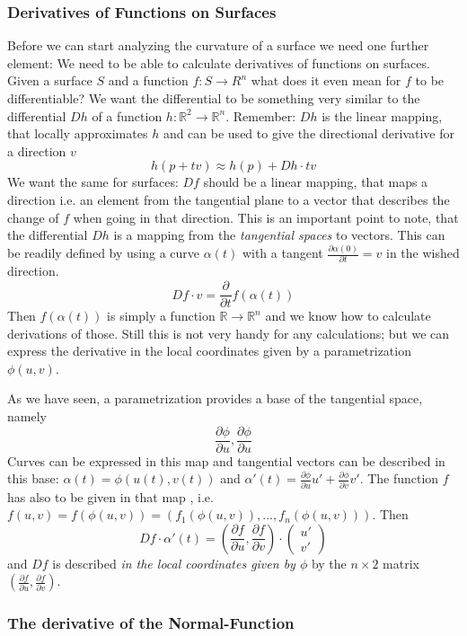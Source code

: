 \subsubsection{Derivatives of Functions on Surfaces}
Before we can start analyzing the curvature of a surface we need one further element: We need to be able to calculate derivatives of functions on surfaces. Given a surface $S$ and a function $f: S \rightarrow R^n$ what does it even mean for $f$ to be differentiable? We want the differential to be something very similar to the differential $Dh$ of a function $h: \mathbb R^2 \rightarrow \mathbb R^n$. Remember: $Dh$ is the linear mapping, that locally approximates $h$ and can be used to give the directional derivative for a direction $v$
\[h( p + tv) \approx h(p) + Dh \cdot tv\]
We want the same for surfaces: $Df$ should be a linear mapping, that maps a direction i.e. an element from the tangential plane to a vector that describes the change of $f$ when going in that direction. This is an important point to note, that the differential $Dh$ is a mapping from the \emph{tangential spaces} to vectors. 
This can be readily defined by using a curve $\alpha (t)$ with a tangent $\frac{\partial \alpha(0)}{\partial t} = v$ in the wished direction.
\[Df \cdot v = \frac{\partial}{\partial t} f(\alpha(t))\]
Then $f(\alpha(t))$ is simply a function $\mathbb R \rightarrow \mathbb R^n$ and we know how to calculate derivations of those. Still this is not very handy for any calculations; but we can express the derivative in the local coordinates given by a parametrization $\phi(u,v)$.

As we have seen, a parametrization provides a base of the tangential space, namely 
\[\frac{\partial\phi}{\partial u}, \frac{\partial\phi}{\partial u}\] 
Curves can be expressed in this map and tangential vectors can be described in this base: $\alpha(t) = \phi(u(t),v(t))$ and $\alpha'(t) = \frac{\partial\phi}{\partial u} u' + \frac{\partial\phi}{\partial v} v'$. The function $f$ has also to be given in that map , i.e. $f(u,v) = f(\phi(u,v)) = (f_1(\phi(u,v)),...,f_n(\phi(u,v)))$. Then 
\[Df \cdot \alpha'(t) = (\frac{\partial f}{\partial u}, \frac{\partial f}{\partial v}) \cdot \begin{pmatrix}
	u' \\ v'\end{pmatrix}\]
and $Df$ is described \emph{in the local coordinates given by $\phi$} by the $ n \times 2$ matrix $(\frac{\partial f}{\partial u}, \frac{\partial f}{\partial v})$.

\subsubsection{The derivative of the Normal-Function}

